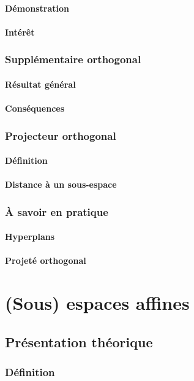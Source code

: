 \documentclass[12pt,a4paper,french]{book}
\begin{document}
			\subsubsection{Démonstration}
			\subsubsection{Intérêt}
		\subsection{Supplémentaire orthogonal}
			\subsubsection{Résultat général}
			\subsubsection{Conséquences}
		\subsection{Projecteur orthogonal}
			\subsubsection{Définition}
			\subsubsection{Distance à un sous-espace}
		\subsection{À savoir en pratique}
			\subsubsection{Hyperplans}
			\subsubsection{Projeté orthogonal}
	
\chapter{(Sous) espaces affines}
	\section{Présentation théorique}
		\subsection{Définition}
\end{document}
